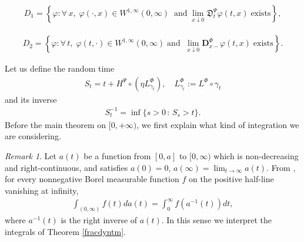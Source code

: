 \documentclass[11pt,a4paper]{article}
\theoremstyle{plain}
\theoremstyle{definition}
\theoremstyle{remark}
\newtheorem{remark}{Remark}
\begin{document}
	\begin{align*}
		D_1 = \left\lbrace \varphi : \forall\, x,\; \varphi(\cdot,x) \in W^{1,\infty}(0,\infty) \;\; \textrm{and} \;  \lim_{x \downarrow 0} \mathfrak{D}^\Psi_t \varphi(t,x) \; \textrm{exists} \right\rbrace,
	\end{align*}
	
	\begin{align*}
		D_2 = \left\lbrace \varphi : \forall\, t,\; \varphi(t,\cdot) \in W^{1,\infty}(0,\infty) \; \textrm{and} \;\; \lim_{x\downarrow 0} \mathbf{D}^\Phi_{x-} \varphi(t,x) \; \textrm{exists} \right\rbrace.
	\end{align*}
	
	Let us define the random time
	\begin{align}
		S_t = t + H^\Psi \circ (\eta L^\Phi_{\gamma_t}), \quad L^\Phi_{\gamma_t} := L^\Phi \circ \gamma_t
		\label{TimeChangeS}
	\end{align}
	and its inverse
	\begin{align*}
		S_t^{-1} = \inf\{ s>0\,:\, S_s>t\}.
	\end{align*}
	Before the main theorem on $[0,+\infty)$, we first explain what kind of integration we are considering.
	\begin{remark}
		Let $a(t)$ be a function from $[0,a]$ to $[0,\infty)$ which is non-decreasing and right-continuous, and satisfies $a(0)=0$, $a(\infty)=\lim_{t \to \infty} a(t)$.
		From \cite[Lemma 2.2, section V]{blumenthal}, for every nonnegative Borel measurable function $f$ on the positive half-line vanishing at infinity,
		\begin{align*}
			\int_{(0,\infty)} f(t) d a(t)= \int_0^\infty f(a^{-1} (t)) dt,
		\end{align*}
		where $a^{-1} (t)$ is the right inverse of $a(t)$. In this sense we interpret the integrals of Theorem \ref{fracdyntm}.
	\end{remark}
	
\end{document}

